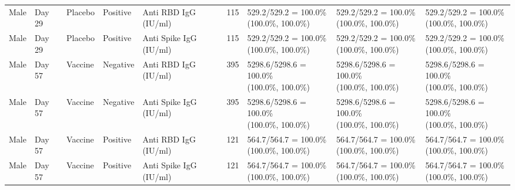 \documentclass[]{book}
\theoremstyle{definition}
\theoremstyle{definition}
\theoremstyle{definition}
\newcommand{\1}{\mathbbm{1}}
\begin{document}
\begin{landscape}
\begin{ThreePartTable}
\begin{longtable}[t]{>{\raggedright\arraybackslash}p{2.7cm}llllllll}
\hspace{1em}Male & Day 29 & Placebo & Positive & Anti RBD IgG (IU/ml) & 115 & \makecell[l]{529.2/529.2 = 100.0\%\\(100.0\%, 100.0\%)} & \makecell[l]{529.2/529.2 = 100.0\%\\(100.0\%, 100.0\%)} & \makecell[l]{529.2/529.2 = 100.0\%\\(100.0\%, 100.0\%)}\\
\hspace{1em}Male & Day 29 & Placebo & Positive & Anti Spike IgG (IU/ml) & 115 & \makecell[l]{529.2/529.2 = 100.0\%\\(100.0\%, 100.0\%)} & \makecell[l]{529.2/529.2 = 100.0\%\\(100.0\%, 100.0\%)} & \makecell[l]{529.2/529.2 = 100.0\%\\(100.0\%, 100.0\%)}\\
\hspace{1em}Male & Day 57 & Vaccine & Negative & Anti RBD IgG (IU/ml) & 395 & \makecell[l]{5298.6/5298.6 = 100.0\%\\(100.0\%, 100.0\%)} & \makecell[l]{5298.6/5298.6 = 100.0\%\\(100.0\%, 100.0\%)} & \makecell[l]{5298.6/5298.6 = 100.0\%\\(100.0\%, 100.0\%)}\\
\hspace{1em}Male & Day 57 & Vaccine & Negative & Anti Spike IgG (IU/ml) & 395 & \makecell[l]{5298.6/5298.6 = 100.0\%\\(100.0\%, 100.0\%)} & \makecell[l]{5298.6/5298.6 = 100.0\%\\(100.0\%, 100.0\%)} & \makecell[l]{5298.6/5298.6 = 100.0\%\\(100.0\%, 100.0\%)}\\
\hspace{1em}Male & Day 57 & Vaccine & Positive & Anti RBD IgG (IU/ml) & 121 & \makecell[l]{564.7/564.7 = 100.0\%\\(100.0\%, 100.0\%)} & \makecell[l]{564.7/564.7 = 100.0\%\\(100.0\%, 100.0\%)} & \makecell[l]{564.7/564.7 = 100.0\%\\(100.0\%, 100.0\%)}\\
\hspace{1em}Male & Day 57 & Vaccine & Positive & Anti Spike IgG (IU/ml) & 121 & \makecell[l]{564.7/564.7 = 100.0\%\\(100.0\%, 100.0\%)} & \makecell[l]{564.7/564.7 = 100.0\%\\(100.0\%, 100.0\%)} & \makecell[l]{564.7/564.7 = 100.0\%\\(100.0\%, 100.0\%)}\\

\end{longtable}
\end{ThreePartTable}
\end{landscape}
\end{document}
